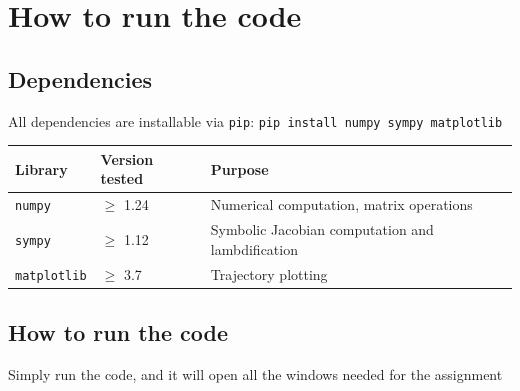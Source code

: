 \section*{How to run the code}

\subsection*{Dependencies}
All dependencies are installable via \texttt{pip}:
\texttt{pip install numpy sympy matplotlib}
\begin{center}
\begin{tabular}{lll}
\toprule
\textbf{Library} & \textbf{Version tested} & \textbf{Purpose} \\
\midrule
\texttt{numpy}      & $\geq$ 1.24 & Numerical computation, matrix operations \\
\texttt{sympy}      & $\geq$ 1.12 & Symbolic Jacobian computation and lambdification \\
\texttt{matplotlib} & $\geq$ 3.7  & Trajectory plotting \\
\bottomrule
\end{tabular}
\end{center}

\subsection*{How to run the code}

Simply run the code, and it will open all the windows needed for the assignment 